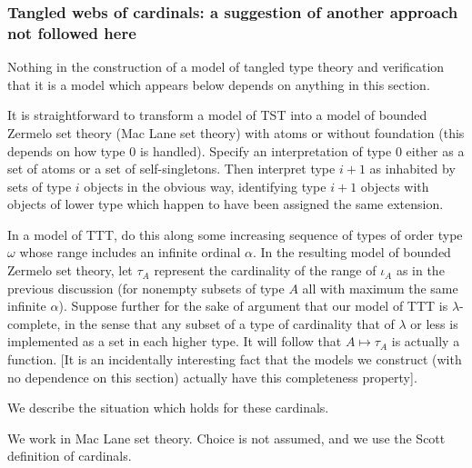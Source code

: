 \documentclass[112pt]{article}
\begin{document}
\newpage

\subsubsection{Tangled webs of cardinals:  a suggestion of another approach not followed here}

Nothing in the construction of a model of tangled type theory and verification that it is a model which appears below depends on anything in this section.

It is straightforward to transform a model of TST into a model of bounded Zermelo set theory (Mac Lane set theory) with atoms or without foundation
(this depends on how type 0 is handled).  Specify an interpretation of type 0 either as a set of atoms or a set of self-singletons.  Then interpret
type $i+1$ as inhabited by sets of type $i$ objects in the obvious way, identifying type $i+1$ objects with objects of lower type which happen to have been assigned the same extension.

In a model of TTT, do this along some increasing sequence of types of order type $\omega$ whose range includes an infinite ordinal $\alpha$.  In the resulting model of bounded Zermelo set theory,
let $\tau_A$ represent the cardinality of the range of $\iota_A$ as in the previous discussion (for nonempty subsets of type $A$ all with maximum the same infinite $\alpha$).  Suppose further for the sake of argument that our model of TTT is $\lambda$-complete, in the sense that any subset of a type of cardinality that of $\lambda$ or less is implemented as a set in each higher type.
It will follow that $A \mapsto \tau_A$ is actually a function. [It is an incidentally interesting fact that the models we construct (with no dependence on this section) actually have this completeness property].

We describe the situation which holds for these cardinals.  

We work in Mac Lane set theory.  Choice is not assumed, and we use the Scott definition of cardinals.
\end{document}

